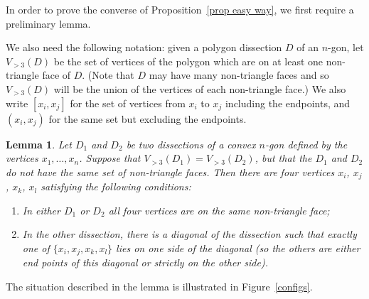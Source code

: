 \documentclass[11pt]{article}
\newtheorem{lem}[thm]{Lemma}
\theoremstyle{remark}
\theoremstyle{definition}
\begin{document}
In order to prove the converse of Proposition~\ref{prop easy way}, we first require a preliminary lemma.

We also need the following notation: given a polygon dissection $D$ of an $n$-gon, let $V_{>3}(D)$ be the set of vertices of the polygon which are on at least one non-triangle face of $D$.  (Note that $D$ may have many non-triangle faces and so $V_{>3}(D)$ will be the union of the vertices of each non-triangle face.) We also write $[x_i,x_j]$ for the set of vertices from $x_i$ to $x_j$ including the endpoints, and $(x_i,x_j)$ for the same set but excluding the endpoints. 

\begin{lem}\label{lem good quads}
Let $D_1$ and $D_2$ be two dissections of a convex $n$-gon defined by the vertices $x_1, \ldots, x_n$.  Suppose that $V_{>3}(D_1) = V_{>3}(D_2)$, but that the $D_1$ and $D_2$ do not have the same set of non-triangle faces.  Then there are four vertices $x_i$, $x_j$, $x_k$, $x_l$ satisfying the following conditions:\begin{enumerate} \item In either $D_1$ or $D_2$ all four vertices are on the same non-triangle face; \item In the other dissection, there is a diagonal of the dissection such that exactly one of $\{x_i, x_j, x_k, x_l\}$ lies on one side of the diagonal (so the others are either end points of this diagonal or strictly on the other side). \end{enumerate}
\end{lem} 

The situation described in the lemma is illustrated in Figure~\ref{configs}.
\end{document}
